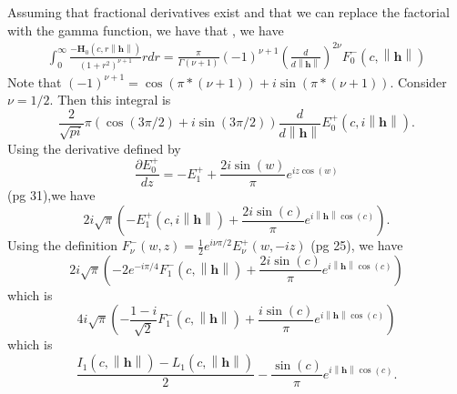 \documentclass[11pt]{article}
\begin{document}
Assuming that fractional derivatives exist and that we can replace the factorial with the gamma function, we have that , we have \begin{align*}
\int_0^\infty \frac{-\boldsymbol{H}_{0}(c, r \left\lVert \boldsymbol{h}\right\rVert)}{(1 + r^2)^{\nu+1}}r dr=
\frac{\pi}{\Gamma(\nu + 1)} (-1)^{\nu + 1} \left(\frac{d}{d\left\lVert \boldsymbol{h}\right\rVert}\right)^{2\nu} F_0^-(c, \left\lVert \boldsymbol{h}\right\rVert)
\end{align*}Note that $(-1)^{\nu + 1} = \cos(\pi * (\nu+1)) + i\sin(\pi * (\nu+1))$. Consider $\nu= 1/2$. Then this integral is $$\frac{2}{\sqrt{pi}}\pi (\cos(3\pi/2)+i\sin(3\pi/2)) \frac{d}{d \left\lVert \boldsymbol{h}\right\rVert} E_0^+(c,i\left\lVert \boldsymbol{h}\right\rVert).$$Using the derivative defined by $$\frac{\partial E_0^+}{dz} =-E_1^+ + \frac{2i\sin(w)}{\pi}e^{iz\cos(w)}$$(pg 31),we have $$ 2i\sqrt{\pi}\left(- E_1^+(c,i\left\lVert \boldsymbol{h}\right\rVert) + \frac{2 i \sin(c)}{\pi } e^{i\left\lVert \boldsymbol{h}\right\rVert \cos(c)}\right).$$
Using the definition $F_\nu^-(w,z) = \frac{1}{2} e^{i\nu\pi/2}E_\nu^+(w, -iz)$ (pg 25), we have $$2i\sqrt{\pi}\left(- 2 e^{-i \pi/4}F_1^-(c,\left\lVert \boldsymbol{h}\right\rVert) + \frac{2 i \sin(c)}{\pi } e^{i\left\lVert \boldsymbol{h}\right\rVert \cos(c)}\right)$$ which is $$4i\sqrt{\pi}\left(-\frac{1-i}{\sqrt{2}}F_1^-(c,\left\lVert \boldsymbol{h}\right\rVert) + \frac{i \sin(c)}{\pi } e^{i\left\lVert \boldsymbol{h}\right\rVert \cos(c)}\right)$$ which is $$\frac{I_1(c,\left\lVert \boldsymbol{h}\right\rVert) - L_1(c, \left\lVert \boldsymbol{h}\right\rVert)}{2}  - \frac{ \sin(c)}{\pi } e^{i\left\lVert \boldsymbol{h}\right\rVert \cos(c)}.$$ 
\end{document}
